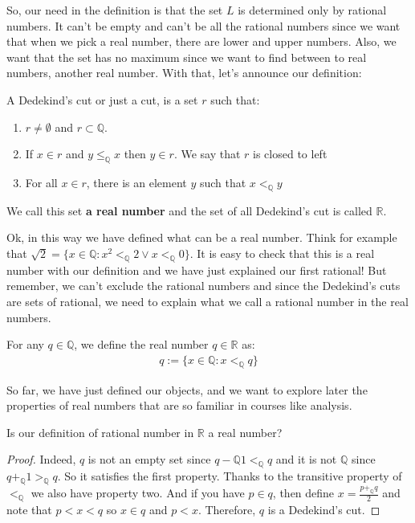 \documentclass{tufte-handout}
\begin{document}
So, our need in the definition is that the set $L$ is determined only by rational numbers. It can't be empty and can't be all the rational numbers since we want that when we pick a real number, there are lower and upper numbers. Also, we want that the set has no maximum since we want to find between to real numbers, another real number. With that, let's announce our definition:
\begin{definition}
	A Dedekind's cut or just a cut, is a set $r$ such that:
	\begin{enumerate}
		\item $r \neq \emptyset$ and $r \subset \mathbb{Q}$.
		\item If $x \in r$ and $y \le_\mathbb{Q} x$ then $y \in r$. We say that $r$ is closed to left
		\item For all $x \in r$, there is an element $y$ such that $x <_\mathbb{Q} y$
	\end{enumerate}
	We call this set \textbf{a real number} and the set of all Dedekind's cut is called $\mathbb{R}$.
\end{definition}

Ok, in this way we have defined what can be a real number. Think for example that $\sqrt{2} = \{x \in \mathbb{Q}: x^2 <_\mathbb{Q} 2 \vee x <_\mathbb{Q} 0\}$. It is easy to check that this is a real number with our definition and we have just explained our first rational! But remember, we can't exclude the rational numbers and since the Dedekind's cuts are sets of rational, we need to explain what we call a rational number in the real numbers.
\begin{definition}
	For any $q \in \mathbb{Q}$, we define the real number $q \in \mathbb{R}$ as:
	\begin{align*}
		q := \{x \in \mathbb{Q}: x <_\mathbb{Q} q\}
	\end{align*}
\end{definition}
So far, we have just defined our objects, and we want to explore later the properties of real numbers that are so familiar in courses like analysis.

\begin{problem}
	Is our definition of rational number in $\mathbb{R}$ a real number?
\end{problem}
\begin{proof}
	Indeed, $q$ is not an empty set since $q-\mathbb{Q} 1 <_\mathbb{Q} q$ and it is not $\mathbb{Q}$ since $q+_\mathbb{Q} 1 >_\mathbb{Q} q$. So it satisfies the first property. Thanks to the transitive property of $<_\mathbb{Q}$ we also have property two. And if you have $p \in q$, then define $x = \frac{p+_\mathbb{Q} q}{2}$ and note that $p < x < q$ so $x \in q$ and $p < x$. Therefore, $q$ is a Dedekind's cut.
\end{proof}
\end{document}
